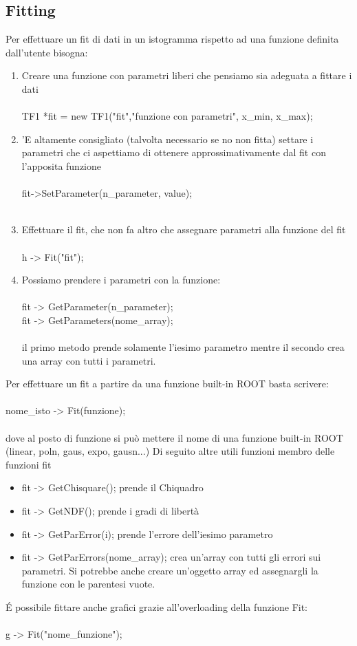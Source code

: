 \documentclass[10pt,a4paper]{article}
\begin{document}
\subsection{Fitting}
Per effettuare un fit di dati in un istogramma rispetto ad una funzione definita dall'utente bisogna:
\begin{enumerate}
	\item Creare una funzione con parametri liberi che pensiamo sia adeguata a fittare i dati\\\\
	TF1 *fit = new TF1("fit","funzione con parametri", x\_min, x\_max);\\
	\item 'E altamente consigliato (talvolta necessario se no non fitta) settare i parametri che ci aspettiamo di ottenere approssimativamente dal fit con l'apposita funzione\\\\
	fit->SetParameter(n\_parameter, value);\\\\
	\item Effettuare il fit, che non fa altro che assegnare parametri alla funzione del fit\\\\
	h -> Fit("fit");\\
	\item Possiamo prendere i parametri con la funzione:\\\\
	 fit -> GetParameter(n\_parameter);\\
	 fit -> GetParameters(nome\_array);\\\\
	 il primo metodo prende solamente l'iesimo parametro mentre il secondo crea una array con tutti i parametri.\\
\end{enumerate}
Per effettuare un fit a partire da una funzione built-in ROOT basta scrivere:\\\\
nome\_isto -> Fit(funzione);\\\\
dove al posto di funzione si può mettere il nome di una funzione built-in ROOT (linear, poln, gaus, expo, gausn...)
Di seguito altre utili funzioni membro delle funzioni fit
\begin{itemize}
	\item fit -> GetChisquare(); 
	prende il Chiquadro
	\item fit -> GetNDF();
	prende i gradi di libertà
	\item fit -> GetParError(i);
	prende l'errore dell'iesimo parametro
	\item fit -> GetParErrors(nome\_array);
	crea un'array con tutti gli errori sui parametri. Si potrebbe anche creare un'oggetto array ed assegnargli la funzione con le parentesi vuote.
\end{itemize}
\'{E} possibile fittare anche grafici grazie all'overloading della funzione Fit:\\\\
g -> Fit("nome\_funzione");\\
\end{document}
